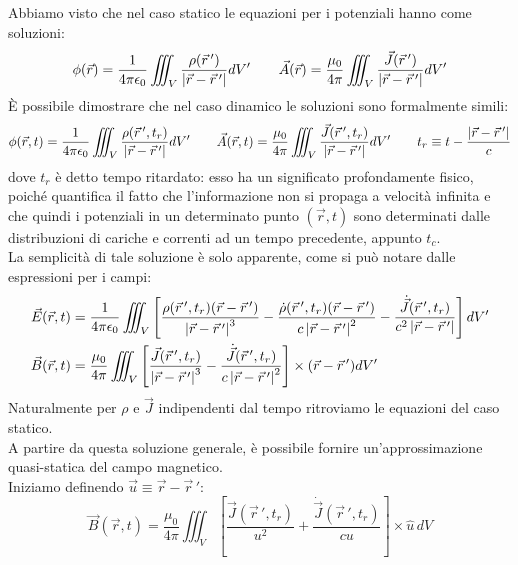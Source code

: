 Abbiamo visto che nel caso statico le equazioni per i potenziali hanno come soluzioni:
\begin{equation}
	\phi(\vec{r}) = \frac{1}{4\pi\epsilon_0} \iiint_V \frac{\rho(\vec{r}\,')}{\left\lvert\vec{r} - \vec{r}\,'\right\rvert} dV' \qquad \vec{A}(\vec{r}) = \frac{\mu_0}{4\pi} \iiint_V \frac{\vec{J}(\vec{r}\,')}{\left\lvert\vec{r} - \vec{r}\,'\right\rvert} dV'
	\label{eq:84}
\end{equation}
È possibile dimostrare che nel caso dinamico le soluzioni sono formalmente simili:
\begin{equation}
	\phi(\vec{r},t) = \frac{1}{4\pi\epsilon_0} \iiint_V \frac{\rho(\vec{r}\,', t_r)}{\left\lvert\vec{r} - \vec{r}\,'\right\rvert} dV' \qquad \vec{A}(\vec{r},t) = \frac{\mu_0}{4\pi} \iiint_V \frac{\vec{J}(\vec{r}\,',t_r)}{\left\lvert\vec{r} - \vec{r}\,'\right\rvert} dV' \qquad t_r \equiv t - \frac{\left\lvert\vec{r} - \vec{r}\,'\right\rvert}{c}
	\label{eq:85}
\end{equation}
dove $ t_r $ è detto tempo ritardato: esso ha un significato profondamente fisico, poiché quantifica il fatto che l'informazione non si propaga a velocità infinita e che quindi i potenziali in un determinato punto $ (\vec{r},t) $ sono determinati dalle distribuzioni di cariche e correnti ad un tempo precedente, appunto $ t_c $. \\ 
%
La semplicità di tale soluzione è solo apparente, come si può notare dalle espressioni per i campi:
\begin{align}
	\vec{E}(\vec{r},t) &= \frac{1}{4\pi \epsilon_0} \iiint_V \left[ \frac{\rho(\vec{r}\,', t_r) (\vec{r} - \vec{r}\,')}{\left\lvert\vec{r} - \vec{r}\,'\right\rvert^3} - \frac{\dot{\rho}(\vec{r}\,', t_r) (\vec{r} - \vec{r}\,')}{c \left\lvert\vec{r} - \vec{r}\,'\right\rvert^2} - \frac{\dot{\vec{J}}(\vec{r}\,', t_r)}{c^2 \left\lvert\vec{r} - \vec{r}\,'\right\rvert} \right] dV' \\ 
	\vec{B}(\vec{r},t) &= \frac{\mu_0}{4\pi} \iiint_V \left[ \frac{\vec{J}(\vec{r}\,', t_r)}{\left\lvert\vec{r} - \vec{r}\,'\right\rvert^3} - \frac{\dot{\vec{J}}(\vec{r}\,', t_r)}{c \left\lvert\vec{r} - \vec{r}\,'\right\rvert^2} \right] \times (\vec{r} - \vec{r}\,') dV'
	\label{eq:86-87}
\end{align}
Naturalmente per $ \rho $ e $ \vec{J} $ indipendenti dal tempo ritroviamo le equazioni del caso statico. \\ 
%
A partire da questa soluzione generale, è possibile fornire un'approssimazione quasi-statica del campo magnetico. \\ 
Iniziamo definendo $ \vec{u} \equiv \vec{r} - \vec{r}\,' $:
\begin{equation}
	\vec{B}(\vec{r},t) = \frac{\mu_0}{4\pi} \iiint_V \left[ \frac{\vec{J}(\vec{r}\,', t_r)}{u^2} + \frac{\dot{\vec{J}}(\vec{r}\,', t_r)}{cu} \right] \times \hat{u} \,dV
	\label{eq:88}
\end{equation}
